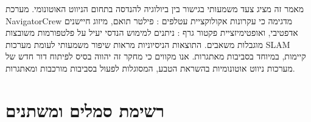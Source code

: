 מאמר זה מציג צעד משמעותי בגישור בין ביולוגיה להנדסה בתחום הניווט האוטונומי. מערכת NavigatorCrew מדגימה כי עקרונות אקולוקציית עטלפים : פילטר תואם, מיזוג חיישנים אדפטיבי, ואופטימיזציית פקטור גרף : ניתנים למימוש הנדסי יעיל על פלטפורמות משובצות מוגבלות משאבים. התוצאות הניסיוניות מראות שיפור משמעותי לעומת מערכות SLAM קיימות, במיוחד בסביבות מאתגרות. אנו מקווים כי מחקר זה יהווה בסיס לפיתוח דור חדש של מערכות ניווט אוטונומיות בהשראת הטבע, המסוגלות לפעול בסביבות מורכבות ומאתגרות.

\appendix
\section{רשימת סמלים ומשתנים}
\label{sec:ch09_appendix}

\begin{table}[htbp]
\centering
\caption{רשימת סמלים ומשתנים נפוצים במאמר.}
\label{tab:ch09_symbols}
\end{table}
